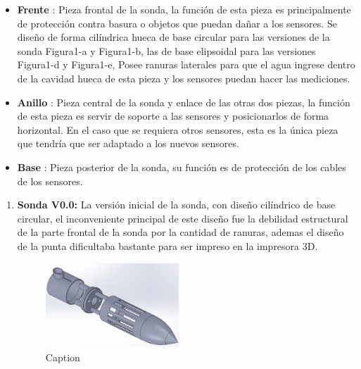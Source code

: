\begin{appendices}
\begin{itemize}
\item \textbf{Frente} : Pieza frontal de la sonda, la función de esta pieza es principalmente de protección contra basura o objetos que puedan dañar a los sensores. Se diseño de forma cilíndrica hueca de base circular para las versiones de la sonda Figura1-a y Figura1-b, las de base elipsoidal para las versiones Figura1-d y Figura1-e, Posee ranuras laterales para que el agua ingrese dentro de la cavidad hueca de esta pieza y los sensores puedan hacer las mediciones.  
\item \textbf{Anillo} : Pieza central de la sonda y enlace de las otras dos piezas, la función de esta pieza es servir de soporte a las sensores y posicionarlos de forma horizontal. En el caso que se requiera otros sensores, esta es la única pieza que tendría que ser adaptado a los nuevos sensores.
\item \textbf{Base}  : Pieza posterior de la sonda, su función es de protección de los cables de los sensores. 
\end{itemize}

\begin{enumerate}
\item \textbf{Sonda V0.0:} La versión inicial de la sonda, con diseño cilíndrico de base circular, el inconveniente principal de este diseño fue la debilidad estructural de la parte frontal de la sonda por la cantidad de ranuras, ademas el diseño de la punta dificultaba bastante para ser impreso en la impresora 3D.
\begin{figure}[H]
    \centering
    \includegraphics[width=50mm]{Imagenes/Sonda_v0.jpg}
    \caption{Caption}
    \label{fig:my_label}
\end{figure}


\end{enumerate}
\end{appendices}
